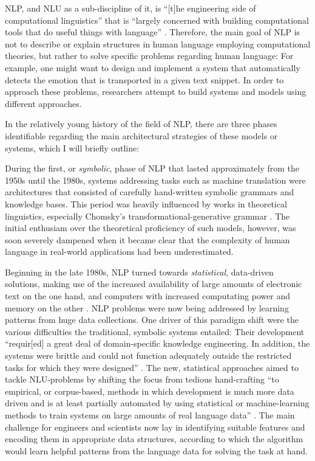 

NLP, and NLU as a sub-discipline of it, is ``[t]he engineering side of computational
linguistics'' that is ``largely concerned with building computational tools that do useful
things with language'' \cite{johnson2009statistical}. Therefore, the main goal of NLP is
not to describe or explain structures in human language employing computational theories,
but rather to solve specific problems regarding human language: For example, one might want
to design and implement a system that automatically detects the emotion that is transported
in a given text snippet. In order to approach these problems, researchers attempt to build
systems and models using different approaches.

In the relatively young history of the field of NLP, there are three phases identifiable
regarding the main architectural strategies of these models or systems, which I will briefly
outline:

During the first, or \emph{symbolic}, phase of NLP that lasted approximately from the 1950s
until the 1980s, systems addressing tasks such as machine translation were architectures that
consisted of carefully hand-written symbolic grammars and knowledge bases. This period was heavily
influenced by works in theoretical linguistics, especially Chomsky's transformational-generative
grammar \citep{chomsky2009syntactic,chomsky2014aspects}. The initial enthusiam over the theoretical
proficiency of such models, however, was soon severely dampened when it became clear
that the complexity of human language in real-world applications had been underestimated.


Beginning in the late 1980s, NLP turned towards \emph{statistical}, data-driven
solutions, making use of the increased availability of large amounts of electronic
text on the one hand, and computers with increased computating power and memory
on the other \citep{liddy2001natural}. NLP problems were now being addressed by
learning patterns from huge data collections. One driver of this paradigm shift
were the various difficulties the traditional, symbolic systems entailed: Their
development ``requir[ed] a great deal of domain-specific knowledge engineering. In
addition, the systems were brittle and could not function adequately outside the
restricted tasks for which they were designed'' \citep[p.~13]{brill1997overview}.
The new, statistical approaches aimed to tackle NLU-problems by shifting the focus
from tedious hand-crafting ``to empirical, or corpus-based, methods in which
development is much more data driven and is at least partially automated by using
statistical or machine-learning methods to train systems on large amounts of real
language data'' \citep[p.~13]{brill1997overview}. The main challenge for engineers
and scientists now lay in identifying suitable features and encoding them in
appropriate data structures, according to which the algorithm would learn helpful
patterns from the language data for solving the task at hand.

